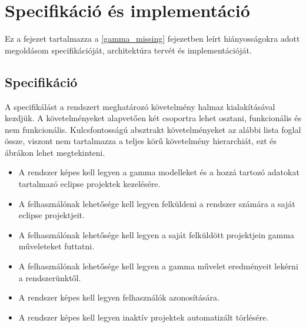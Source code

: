 \chapter{Specifikáció és implementáció}

Ez a fejezet tartalmazza a \ref{gamma_missing} fejezetben leírt hiányosságokra adott megoldásom specifikációját, architektúra tervét és implementációját. 

\section{Specifikáció} \label{specification}

A specifikálást a rendszert meghatározó követelmény halmaz kialakításával kezdjük. A követelményeket alapvetően két csoportra lehet osztani, funkcionális és nem funkcionális. Kulcsfontosságú absztrakt követelményeket az alábbi lista foglal össze, viszont nem tartalmazza a teljes körű követelmény hierarchiát, ezt  és  ábrákon lehet megtekinteni.

\begin{itemize}
	\item A rendszer képes kell legyen a gamma modelleket és a hozzá tartozó adatokat tartalmazó eclipse projektek kezelésére.
	\item A felhasználónak lehetősége kell legyen felküldeni a rendszer számára a saját eclipse projektjeit.
	\item A felhasználónak lehetősége kell legyen a saját felküldött projektjein gamma műveleteket futtatni.
	\item A felhasználónak lehetősége kell legyen a gamma művelet eredményeit lekérni a rendszerünktől.
	\item A rendszer képes kell legyen felhasználók azonosítására.
	\item A rendszer képes kell legyen inaktív projektek automatizált törlésére.
\end{itemize}

